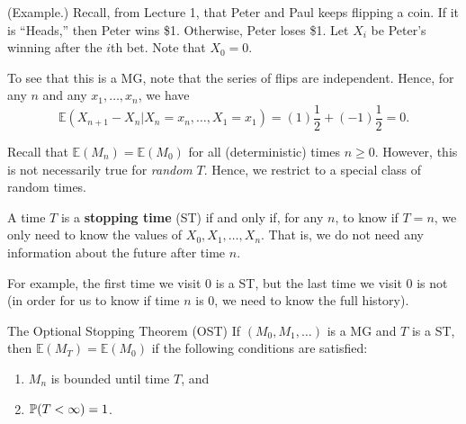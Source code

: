 \documentclass[letterpaper]{article}
\begin{document}
\begin{mdframed}[]
    (Example.) Recall, from Lecture 1, that Peter and Paul keeps flipping a coin. If it is ``Heads,'' then Peter wins \$1. Otherwise, Peter loses \$1. Let $X_i$ be Peter's winning after the $i$th bet. Note that $X_0 = 0$.

    \bigskip 

    To see that this is a MG, note that the series of flips are independent. Hence, for any $n$ and any $x_1, \dots, x_n$, we have 
    \[\mathbb{E}(X_{n + 1} - X_{n} | X_n = x_n, \dots, X_1 = x_1) = (1)\frac{1}{2} + (-1) \frac{1}{2} = 0.\]
\end{mdframed}
Recall that $\mathbb{E}(M_n) = \mathbb{E}(M_0)$ for all (deterministic) times $n \geq 0$. However, this is not necessarily true for \emph{random} $T$. Hence, we restrict to a special class of random times. 

\begin{definition}{}{}
    A time $T$ is a \textbf{stopping time} (ST) if and only if, for any $n$, to know if $T = n$, we only need to know the values of $X_0, X_1, \dots, X_n$. That is, we do not need any information about the future after time $n$. 
\end{definition}
For example, the first time we visit 0 is a ST, but the last time we visit 0 is not (in order for us to know if time $n$ is 0, we need to know the full history).

\begin{theorem}{The Optional Stopping Theorem (OST)}{}
    If $(M_0, M_1, \dots)$ is a MG and $T$ is a ST, then $\mathbb{E}(M_T) = \mathbb{E}(M_0)$ if the following conditions are satisfied: 
    \begin{enumerate}
        \item $M_n$ is bounded until time $T$, and 
        \item $\mathbb{P}(T < \infty) = 1$. 
    \end{enumerate}
\end{theorem}
\end{document}
